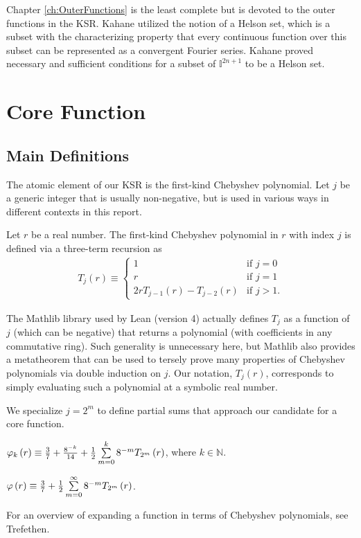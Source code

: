 Chapter \ref{ch:OuterFunctions} is the least complete but is devoted to the outer functions in the KSR. Kahane utilized the notion of a Helson set, which is a subset with the characterizing property that every continuous function over this subset can be represented as a convergent Fourier series. Kahane proved necessary and sufficient conditions for a subset of $\mathbb{I}^{2n + 1}$ to be a Helson set.

\chapter{Core Function}\label{ch:CoreFunction}

\section{Main Definitions}\label{sec:MainDefinitions}

The atomic element of our KSR is the first-kind Chebyshev polynomial. Let $j$ be a generic integer that is usually non-negative, but is used in various ways in different contexts in this report.
\begin{definition}
  \label{def:T}
  \leanok
  Let $r$ be a real number. The first-kind Chebyshev polynomial in $r$ with index $j$ is defined via a three-term recursion as
  \begin{align*}
T_j\left(r\right) \equiv 
\begin{cases}
1 & \text{if } j = 0 \\
r & \text{if } j = 1 \\
2 r T_{j - 1}\left(r\right) - T_{j - 2}\left(r\right) & \text{if } j > 1.
\end{cases}
  \end{align*}
\end{definition}
\begin{remark*}
The Mathlib library used by Lean (version 4) actually defines $T_j$ as a function of $j$ (which can be negative) that returns a polynomial (with coefficients in any commutative ring). Such generality is unnecessary here, but Mathlib also provides a metatheorem that can be used to tersely prove many properties of Chebyshev polynomials via double induction on $j$. Our notation, $T_j\left(r\right)$, corresponds to simply evaluating such a polynomial at a symbolic real number. 
\end{remark*}
We specialize $j = 2^m$ to define partial sums that approach our candidate for a core function.
\begin{definition}
  \label{def:approx}
  \leanok
  $\varphi_k\left(r\right) \equiv \threesevenths + \offset + \halfsum{0}{k}{r}$, where $k \in \mathbb{N}$.
\end{definition}
\begin{definition}
  \label{def:core}
  \leanok
  $\varphi\left(r\right) \equiv \threesevenths + \halfsum{0}{\infty}{r}$.
\end{definition}
\noindent For an overview of expanding a function in terms of Chebyshev polynomials, see Trefethen.

